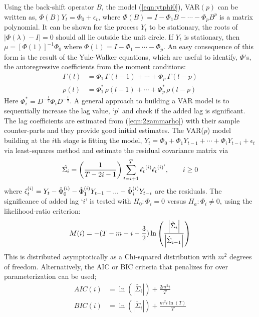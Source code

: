 Using the back-shift operator $B$, the model (\ref{eqn:ytphi0}), VAR$(p)$ can be written as, $ \Phi(B)Y_t=\Phi_0+\epsilon_t$, where $\Phi(B)=I-\Phi_1B-\cdots-\Phi_pB^p$ is a matrix polynomial. It can be shown for the process $Y_t$ to be stationary, the roots of $\left| \Phi(\lambda)-I \right|=0$ should all lie outside the unit circle. If $Y_t$ is stationary, then $\mu=[\Phi(1)]^{-1}\Phi_0$ where $\Phi(1)=I-\Phi_1-\cdots-\Phi_p$. An easy consequence of this form is the result of the Yule-Walker equations, which are useful to identify, $\Phi$'s, the autoregressive coefficients from the moment conditions:
	\begin{equation}\label{eqn:2gammarho}
	\begin{split}
	\Gamma(l)&= \Phi_1 \,\Gamma(l-1) +\cdots + \Phi_p\, \Gamma(l-p) \\
	\rho(l)&= \Phi_1^* \,\rho(l-1) + \cdots + \Phi_p^* \, \rho(l-p) 
	\end{split}
	\end{equation}
Here $\Phi_i^*=D^{-\frac{1}{2}}\Phi_iD^{-\frac{1}{2}}$. A general approach to building a VAR model is to sequentially increase the lag value, `$p$' and check if the added lag is significant. The lag coefficients are estimated from (\ref{eqn:2gammarho}) with their sample counter-parts and they provide good initial estimates. The VAR($p$) model building at the $i$th stage is fitting the model, $Y_t=\Phi_0+\Phi_1Y_{t-1}+\cdots+\Phi_iY_{t-i}+\epsilon_t$ via least-squares method and estimate the residual covariance matrix via
	\begin{equation}\label{eqn:2hatsigma}
	\hat{\Sigma_i} = \left(\frac{1}{T-2i-1} \right) \sum_{t=i+1}^{T}\Hat{\epsilon_t}^{(i)}{{\hat{\epsilon_t}^{(i)^\prime}}}, \qquad i \geq 0
	\end{equation}
where $ \Hat{\epsilon}_t^{(i)}=Y_t-\Hat{\Phi}_0^{(i)}-\Hat{\Phi}_1^{(i)}Y_{t-1}-...-\Hat{\Phi}_i^{(i)}Y_{t-i}$ are the residuals. The significance of added lag `$i$' is tested with $H_0: \Phi_i=0$ versus $H_a: \Phi_i \neq 0$, using the likelihood-ratio criterion:
	\begin{equation}\label{eqn:2mi}
	M(i)= -(T-m-i-\frac{3}{2}) \ln\left(\frac{\left| \Hat{\Sigma}_i \right|}{\left| \Hat{\Sigma}_{i-1} \right|}\right)
	\end{equation}
This is distributed asymptotically as a Chi-squared distribution with $m^2$ degrees of freedom. Alternatively, the AIC or BIC criteria that penalizes for over parameterization can be used; 
	\begin{equation}\label{eqn:2aicbic}
	\begin{split}
	AIC(i)&= \ln\left(\left| \tilde{\Sigma_i} \right|\right)+\frac{2m^2i}{T} \\
	BIC(i)&= \ln\left(\left| \tilde{\Sigma_i} \right|\right)+\frac{m^2i \ln(T)}{T}
	\end{split}
	\end{equation}

